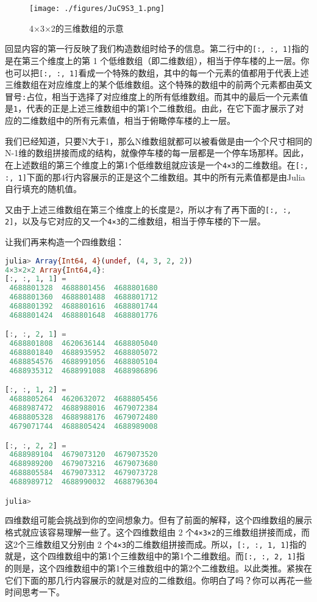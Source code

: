 \begin{figure}[ht]
\centering
\texttt{[image: ./figures/JuC9S3\_1.png]}
\caption{4×3×2的三维数组的示意} \label{JuC9S3_fig1}
\end{figure}


回显内容的第一行反映了我们构造数组时给予的信息。第二行中的\verb|[:, :, 1]|指的是在第三个维度上的第 1 个低维数组（即二维数组），相当于停车楼的上一层。你也可以把\verb|[:, :, 1]|看成一个特殊的数组，其中的每一个元素的值都用于代表上述三维数组在对应维度上的某个低维数组。这个特殊的数组中的前两个元素都由英文冒号\verb|:|占位，相当于选择了对应维度上的所有低维数组。而其中的最后一个元素值是\verb|1|，代表的正是上述三维数组中的第1个二维数组。由此，在它下面才展示了对应的二维数组中的所有元素值，相当于俯瞰停车楼的上一层。

我们已经知道，只要N大于1，那么N维数组就都可以被看做是由一个个尺寸相同的N-1维的数组拼接而成的结构，就像停车楼的每一层都是一个停车场那样。因此，在上述数组的第三个维度上的第1个低维数组就应该是一个\verb|4×3|的二维数组。在\verb|[:, :, 1]|下面的那4行内容展示的正是这个二维数组。其中的所有元素值都是由Julia自行填充的随机值。

又由于上述三维数组在第三个维度上的长度是2，所以才有了再下面的\verb|[:, :, 2]|，以及与它对应的又一个\verb|4×3|的二维数组，相当于停车楼的下一层。

让我们再来构造一个四维数组：

\begin{lstlisting}[language=julia]
julia> Array{Int64, 4}(undef, (4, 3, 2, 2))
4×3×2×2 Array{Int64,4}:
[:, :, 1, 1] =
 4688801328  4688801456  4688801680
 4688801360  4688801488  4688801712
 4688801392  4688801616  4688801744
 4688801424  4688801648  4688801776

[:, :, 2, 1] =
 4688801808  4620636144  4688805040
 4688801840  4688935952  4688805072
 4688854576  4688991056  4688805104
 4688935312  4688991088  4688986896

[:, :, 1, 2] =
 4688805264  4620632072  4688805456
 4688987472  4688988016  4679072384
 4688805328  4688988176  4679072480
 4679071744  4688805424  4688989008

[:, :, 2, 2] =
 4688989104  4679073120  4679073520
 4688989200  4679073216  4679073680
 4688805584  4679073312  4679073728
 4688989712  4688990032  4688796304

julia> 
\end{lstlisting}

四维数组可能会挑战到你的空间想象力。但有了前面的解释，这个四维数组的展示格式就应该容易理解一些了。这个四维数组由 2 个\verb|4×3×2|的三维数组拼接而成，而这2个三维数组又分别由 2 个\verb|4×3|的二维数组拼接而成。所以，\verb|[:, :, 1, 1]|指的就是，这个四维数组中的第1个三维数组中的第1个二维数组。而\verb|[:, :, 2, 1]|指的则是，这个四维数组中的第1个三维数组中的第2个二维数组。以此类推。紧挨在它们下面的那几行内容展示的就是对应的二维数组。你明白了吗？你可以再花一些时间思考一下。

